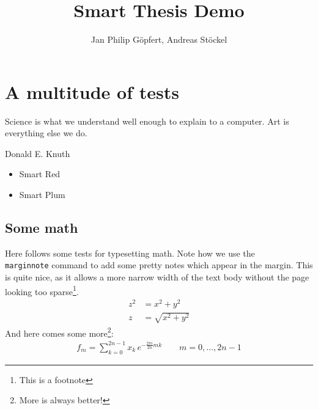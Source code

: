 \documentclass[a4paper,11pt]{memoir}
\title{Smart Thesis Demo}
\author{Jan Philip Göpfert, Andreas Stöckel}
\begin{document}
\frontmatter

\begin{titlingpage}
  \maketitle
\end{titlingpage}

\tableofcontents

\mainmatter

\chapter{A multitude of tests}

\epigraph{Science is what we understand well enough to explain to a computer. Art is everything else we do.}{Donald E. Knuth}

\blindtext


\begin{itemize}
  \item{\color{smartred} Smart Red}
  \item{\color{smartplum} Smart Plum}
\end{itemize}


\section{Some math}

Here follows some tests for typesetting math. Note how we use the \texttt{\\marginnote} command to add some pretty notes which appear in the margin. This is quite nice, as it allows a more narrow width of the text body without the page looking too sparse\footnote{This is a footnote}.
\begin{align}
  z^2 &= x^2 + y^2 \\
  z &= \sqrt{x^2 + y^2}
\end{align}
And here comes some more\footnote{More is always better!}:
\begin{align}
	f_m =  \sum_{k=0}^{2n-1} x_k \, e^{-\frac{2\pi i}{2n} mk } \label{eqn:dft}
\qquad
m = 0,\dotsc,2n-1
\end{align}
\end{document}
